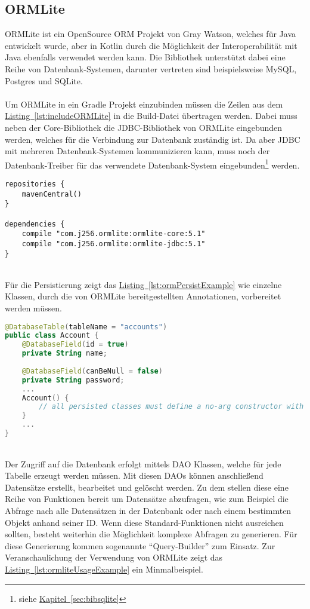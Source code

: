 \subsection{ORMLite}\label{sec:bibormlite}
ORMLite ist ein OpenSource \gls{ORM} Projekt von Gray Watson, welches für Java entwickelt wurde, aber in Kotlin durch die Möglichkeit der Interoperabilität mit Java ebenfalls verwendet werden kann. Die Bibliothek unterstützt dabei eine Reihe von Datenbank-Systemen, darunter vertreten sind beispielsweise MySQL, Postgres und SQLite.\\
\\
Um ORMLite in ein Gradle Projekt einzubinden müssen die Zeilen aus dem \hyperref[lst:includeORMLite]{Listing~\ref{lst:includeORMLite}} in die Build-Datei übertragen werden. Dabei muss neben der Core-Bibliothek die \gls{JDBC}-Bibliothek von ORMLite eingebunden werden, welches für die Verbindung zur Datenbank zuständig ist. Da aber \gls{JDBC} mit mehreren Datenbank-Systemen kommunizieren kann, muss noch der Datenbank-Treiber für das verwendete Datenbank-System eingebunden\footnote{siehe \hyperref[sec:bibsqlite]{Kapitel~\ref{sec:bibsqlite}}} werden.
\\
\begin{lstlisting}[style=lstStyleFramed, language=Gradle, caption={Einbindung der Bibliothek ORMLite mittels Gradle}, label=lst:includeORMLite, float]
repositories {
	mavenCentral()
}

dependencies {
	compile "com.j256.ormlite:ormlite-core:5.1"
	compile "com.j256.ormlite:ormlite-jdbc:5.1"
}
\end{lstlisting}
\\
Für die Persistierung zeigt das \hyperref[lst:ormPersistExample]{Listing~\ref{lst:ormPersistExample}} wie einzelne Klassen, durch die von ORMLite bereitgestellten Annotationen, vorbereitet werden müssen.
\\
\begin{lstlisting}[style=lstStyleFramed, language=Kotlin, caption={Beispiel: Persistierung einer Klasse mittels ORMLite \cite{ormlite}},label=lst:ormPersistExample, float]
@DatabaseTable(tableName = "accounts")
public class Account {
	@DatabaseField(id = true)
	private String name;
	
	@DatabaseField(canBeNull = false)
	private String password;
	...
	Account() {
		// all persisted classes must define a no-arg constructor with at least package visibility
	}
	...    
}
\end{lstlisting}
\\
Der Zugriff auf die Datenbank erfolgt mittels \gls{DAO} Klassen, welche für jede Tabelle erzeugt werden müssen. Mit diesen \glspl{DAO} können anschließend Datensätze erstellt, bearbeitet und gelöscht werden. Zu dem stellen diese eine Reihe von Funktionen bereit um Datensätze abzufragen, wie zum Beispiel die Abfrage nach alle Datensätzen in der Datenbank oder nach einem bestimmten Objekt anhand seiner ID. Wenn diese Standard-Funktionen nicht ausreichen sollten, besteht weiterhin die Möglichkeit komplexe Abfragen zu generieren. Für diese Generierung kommen sogenannte \enquote{Query-Builder} zum Einsatz. Zur Veranschaulichung der Verwendung von ORMLite zeigt das \hyperref[lst:ormliteUsageExample]{Listing~\ref{lst:ormliteUsageExample}} ein Minmalbeispiel.
